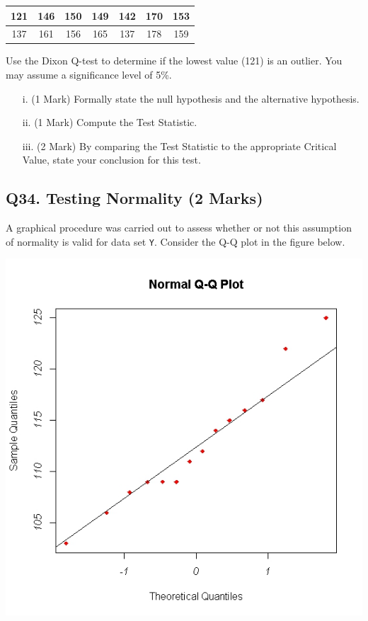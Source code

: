 \documentclass[a4paper,12pt]{article}
\begin{document}
\begin{center}
	\begin{tabular}{|c|c|c|c|c|c|c|}
		\hline
		121 & 146 & 150 &149 &142 &170& 153\\ \hline
		137 & 161 & 156& 165& 137& 178& 159
		\\ \hline
	\end{tabular}
\end{center}
Use the Dixon Q-test to determine if the lowest value (121) is an outlier. You may assume a significance level of 5\%.

\begin{itemize}
	\item[i.] (1 Mark) Formally state the null hypothesis and the alternative hypothesis.
	\item[ii.] (1 Mark) Compute the Test Statistic.
	\item[iii.] (2 Mark) By comparing the Test Statistic to the appropriate Critical Value, state your conclusion for this test.
\end{itemize}

\subsection*{Q34. Testing Normality (2 Marks)} %
A graphical procedure was carried out to assess whether or not this assumption of normality is valid for data set \texttt{Y}. Consider the Q-Q plot in the figure below.

\begin{center}
	\includegraphics[scale=0.45]{images/Q5examQQplot}
\end{center}
\end{document}
